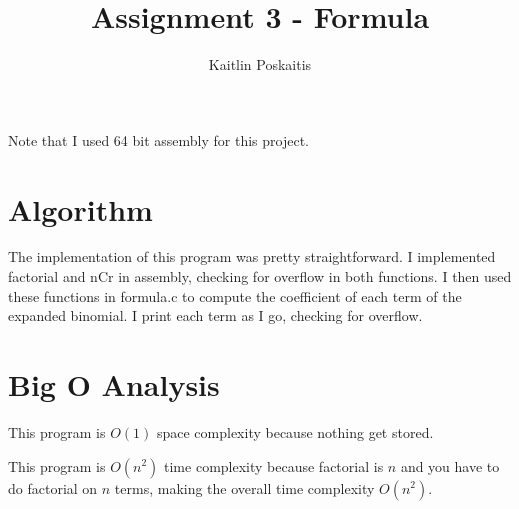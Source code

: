 \documentclass[11pt]{article}
\title{\bf Assignment 3 - Formula}
\author{Kaitlin Poskaitis}
\date{}
\begin{document}
\maketitle

Note that I used 64 bit assembly for this project.

\section*{Algorithm}

The implementation of this program was pretty straightforward. I implemented
factorial and nCr in assembly, checking for overflow in both functions.  I then 
used these functions in formula.c to compute the coefficient of each term of the
expanded binomial. I print each term as I go, checking for overflow.

\section*{Big O Analysis}

This program is $O(1)$ space complexity because nothing get stored.

This program is $O(n^{2})$ time complexity because factorial is $n$ and you have
to do factorial on $n$ terms, making the overall time complexity $O(n^{2})$.
\end{document}
